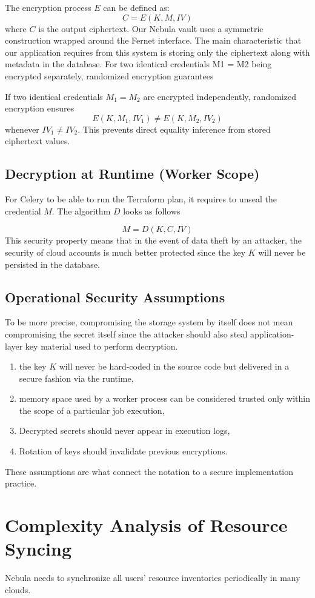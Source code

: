 The encryption process $E$ can be defined as:
\[ C = E(K, M, IV) \]
where $C$ is the output ciphertext. Our Nebula vault uses a symmetric construction wrapped around the Fernet interface. The main characteristic that our application requires from this system is storing only the ciphertext along with metadata in the database.
For two identical credentials M1 = M2 being encrypted separately, randomized encryption guarantees


If two identical credentials $M_1 = M_2$ are encrypted independently, randomized encryption ensures
\[
E(K, M_1, IV_1) \neq E(K, M_2, IV_2)
\]
whenever $IV_1 \neq IV_2$. This prevents direct equality inference from stored ciphertext values.

\subsection{Decryption at Runtime (Worker Scope)}
For Celery to be able to run the Terraform plan, it requires to unseal the credential $M$. The algorithm $D$ looks as follows

\[ M = D(K, C, IV) \]
This security property means that in the event of data theft by an attacker, the security of cloud accounts is much better protected since the key $K$ will never be persisted in the database.

\subsection{Operational Security Assumptions}
To be more precise, compromising the storage system by itself does not mean compromising the secret itself since the attacker should also steal application-layer key material used to perform decryption.
\begin{enumerate}
    \item the key $K$  will never be hard-coded in the source code but delivered in a secure fashion via the runtime,
    \item memory space used by a worker process can be considered trusted only within the scope of a particular job execution,
    \item Decrypted secrets should never appear in execution logs,
    \item Rotation of keys should invalidate previous encryptions.
\end{enumerate}
These assumptions are what connect the notation to a secure implementation practice.

\section{Complexity Analysis of Resource Syncing}
Nebula needs to synchronize all users’ resource inventories periodically in many clouds. 

